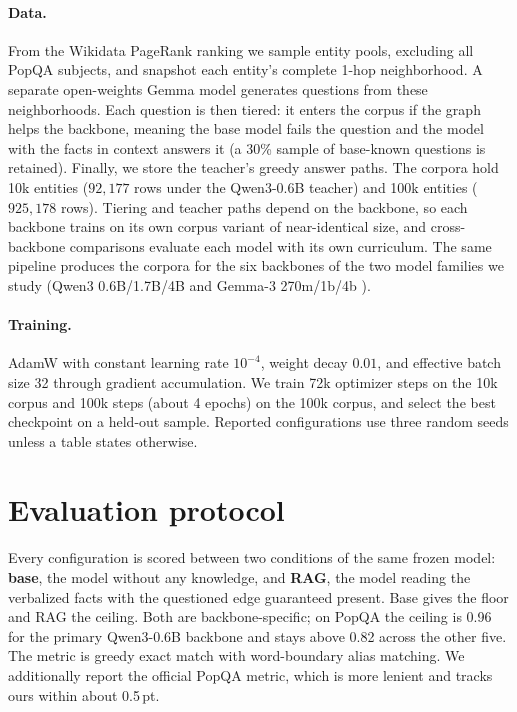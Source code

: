 \documentclass{article}
\newcommand{\popqa}{PopQA}
\begin{document}
\paragraph{Data.} From the Wikidata PageRank ranking we sample entity pools, excluding all
\popqa{} subjects, and snapshot each entity's complete 1-hop neighborhood. A separate
open-weights Gemma model generates questions from these neighborhoods. Each question is then
tiered: it enters the corpus if the graph helps the backbone, meaning the base
model fails the question and the model with the facts in context answers it (a 30\% sample of
base-known questions is retained). Finally, we store the teacher's greedy answer paths. The
corpora hold 10k entities ($92{,}177$ rows under the Qwen3-0.6B \citep{qwen} teacher) and
100k entities ($925{,}178$ rows). Tiering and teacher paths depend on the backbone, so each
backbone trains on its own corpus variant of near-identical size, and cross-backbone
comparisons evaluate each model with its own curriculum. The same pipeline produces the corpora for the six backbones of the two model families we study
(Qwen3 0.6B/1.7B/4B and Gemma-3 270m/1b/4b \citep{gemma3}).

\paragraph{Training.} AdamW with constant learning rate $10^{-4}$, weight decay $0.01$, and
effective batch size 32 through gradient accumulation. We train 72k optimizer steps on the
10k corpus and 100k steps (about 4 epochs) on the 100k corpus, and select the best checkpoint
on a held-out sample. Reported configurations use three random seeds unless a table states
otherwise.

\section{Evaluation protocol}
\label{sec:protocol}

Every configuration is scored between two conditions of the same frozen model: \textbf{base},
the model without any knowledge, and \textbf{RAG}, the model reading the verbalized facts with
the questioned edge guaranteed present. Base gives the floor and RAG the ceiling. Both
are backbone-specific; on \popqa{} the ceiling is 0.96 for the primary Qwen3-0.6B backbone
and stays above 0.82 across the other five. The metric is greedy exact match with word-boundary alias matching. We
additionally report the official \popqa{} metric, which is more lenient and tracks ours within
about 0.5\,pt.
\end{document}
